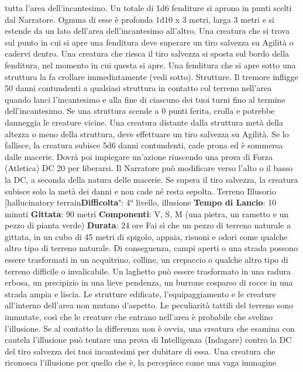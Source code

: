 \begin{multicols}{2}
tutta l’area dell’incantesimo. Un totale di 1d6 fenditure si
aprono in punti scelti dal Narratore. Ognuna di esse è
profonda 1d10 x 3 metri, larga 3 metri e si estende da
un lato dell’area dell’incantesimo all’altro. Una creatura
che si trova sul punto in cui si apre una fenditura deve
superare un tiro salvezza su Agilità o cadervi
dentro. Una creatura che riesca il tiro salvezza si sposta
sul bordo della fenditura, nel momento in cui questa si
apre.
Una fenditura che si apre sotto una struttura la fa
crollare immediatamente (vedi sotto).
Strutture. Il tremore infligge 50 danni contundenti a
qualsiasi struttura in contatto col terreno nell’area
quando lanci l’incantesimo e alla fine di ciascuno dei
tuoi turni fino al termine dell’incantesimo. Se una
struttura scende a 0 punti ferita, crolla e potrebbe
danneggia le creature vicine. Una creatura distante
dalla struttura metà della altezza o meno della struttura,
deve effettuare un tiro salvezza su Agilità. Se lo
fallisce, la creatura subisce 5d6 danni contundenti,
cade prona ed è sommersa dalle macerie. Dovrà poi
impiegare un’azione riuscendo una prova di Forza
(Atletica) DC 20 per liberarsi. Il Narratore può modificare
verso l’alto o il basso la DC, a seconda della natura
delle macerie. Se supera il tiro salvezza, la creatura
subisce solo la metà dei danni e non cade né resta
sepolta.
Terreno Illusorio
[hallucinatory terrain\textbf{Difficolta'}:
4° livello, illusione
\textbf{Tempo di Lancio}: 10 minuti
\textbf{Gittata}: 90 metri
\textbf{Componenti}: V, S, M (una pietra, un rametto e un
pezzo di pianta verde)
\textbf{Durata}: 24 ore
Fai sì che un pezzo di terreno naturale a gittata, in un
cubo di 45 metri di spigolo, appaia, risuoni e odori come
qualche altro tipo di terreno naturale. Di conseguenza,
campi aperti o una strada possono essere trasformati in
un acquitrino, colline, un crepaccio o qualche altro tipo
di terreno difficile o invalicabile. Un laghetto può essere
trasformato in una radura erbosa, un precipizio in una
lieve pendenza, un burrone cosparso di rocce in una
strada ampia e liscia. Le strutture edificate,
l’equipaggiamento e le creature all’interno dell’area non
mutano d’aspetto.
Le peculiarità tattili del terreno sono immutate, così che
le creature che entrano nell’area è probabile che
svelino l’illusione. Se al contatto la differenza non è
ovvia, una creatura che esamina con cautela l’illusione
può tentare una prova di Intelligenza (Indagare) contro
la DC del tiro salvezza dei tuoi incantesimi per dubitare
di essa. Una creatura che riconosca l’illusione per
quello che è, la percepisce come una vaga immagine

\end{multicols}
